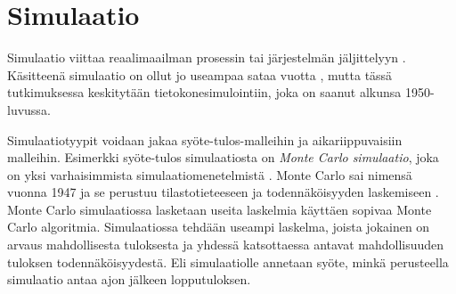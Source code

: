 \documentclass[utf8]{gradu3}
\begin{document}
\section{Simulaatio} \label{simulaatio}
\begin{comment}
Käytännössä tämä alaluku on vahvasti sidoksissa edelliseen. Mikä on sitten oikea jako näiden välillä eri aihepiirien osalta, onkin vaikeampi kysymys. Missä määrin simulaatioiden tyypit ovat suoraan sidoksissa mallien tyyppeihin, missä määrin samalla mallirakenteella voi toteuttaa erityyppisiä simulointeja.
\end{comment}
Simulaatio viittaa reaalimaailman prosessin tai 
järjestelmän jäljittelyyn \parencite{banks1999introduction}. 
Käsitteenä simulaatio on ollut jo useampaa sataa vuotta 
\parencite{HistoryOfSimulation}, 
mutta tässä tutkimuksessa keskitytään tietokonesimulointiin, 
joka on saanut alkunsa 1950-luvussa. 
%
\parencites%
    {HistoryOfSimulation}%
    {historyOfSimulation1996}
\relax
%

\begin{comment}
Kyllähän aikariippuvillakin malleilla on syöte ja tulos. Niillä on vain monimutkaisempi sisäinen tila, joka muistaa nykyhetkeä aiempien syötteiden vaikutusta. Perinteinen Monte-Carlo (funktion/todennäköisyysjakauman integrointina) menee tuohon staatiseen syöte-tulos kategoriaan. Toisaalta MCMC on luonteeltaanhistoriaa mukanaan kantava prosessi vaikka silläkin lopulta tähdätään  staattiseen (stokastiseen) tulokseen.
\end{comment}
Simulaatiotyypit voidaan jakaa syöte-tulos-malleihin 
ja aikariippuvaisiin malleihin. Esimerkki syöte-tulos simulaatiosta on
\textit{Monte Carlo simulaatio}, joka on yksi varhaisimmista simulaatiomenetelmistä
\parencites%
    {historyOfSimulation1996}%
    {historyOfMonte}
\relax
%
. 
Monte Carlo sai nimensä vuonna 1947 \parencite{historyOfMonte}
ja se perustuu tilastotieteeseen ja todennäköisyyden laskemiseen
\parencite{historyOfSimulation1996}.
Monte Carlo simulaatiossa lasketaan useita laskelmia käyttäen sopivaa 
Monte Carlo algoritmia.
Simulaatiossa tehdään useampi laskelma, 
joista jokainen on arvaus mahdollisesta tuloksesta ja yhdessä katsottaessa
antavat mahdollisuuden tuloksen todennäköisyydestä. 
Eli simulaatiolle annetaan syöte, minkä perusteella simulaatio antaa
ajon jälkeen lopputuloksen.
\end{document}
